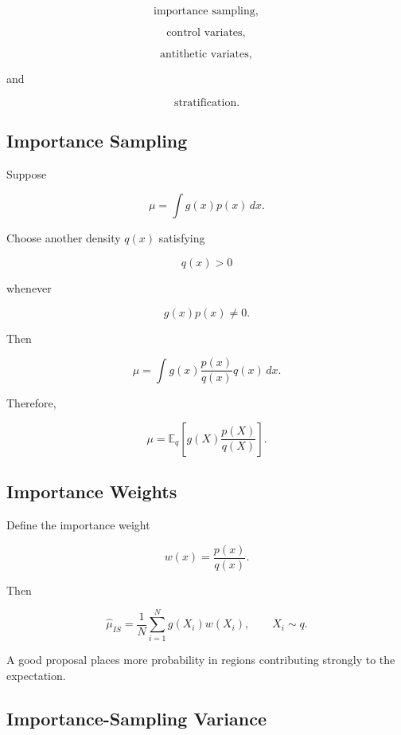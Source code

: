 \[
\boxed{
\text{importance sampling},
}
\]

\[
\boxed{
\text{control variates},
}
\]

\[
\boxed{
\text{antithetic variates},
}
\]

and

\[
\boxed{
\text{stratification}.
}
\]

\subsection{Importance Sampling}
\label{subsec:importance-sampling}

Suppose

\[
\mu
=
\int
g(x)
p(x)\,dx.
\]

Choose another density \(q(x)\) satisfying

\[
q(x)>0
\]

whenever

\[
g(x)p(x)\neq0.
\]

Then

\[
\mu
=
\int
g(x)
\frac{
p(x)
}{
q(x)
}
q(x)\,dx.
\]

Therefore,

\[
\boxed{
\mu
=
\mathbb{E}_q
\left[
g(X)
\frac{
p(X)
}{
q(X)
}
\right].
}
\]

\subsection{Importance Weights}
\label{subsec:importance-weights}

Define the importance weight

\[
\boxed{
w(x)
=
\frac{
p(x)
}{
q(x)
}.
}
\]

Then

\[
\boxed{
\widehat{\mu}_{IS}
=
\frac1N
\sum_{i=1}^{N}
g(X_i)
w(X_i),
\qquad
X_i\sim q.
}
\]

A good proposal places more probability in regions contributing strongly
to the expectation.

\subsection{Importance-Sampling Variance}
\label{subsec:importance-sampling-variance}

